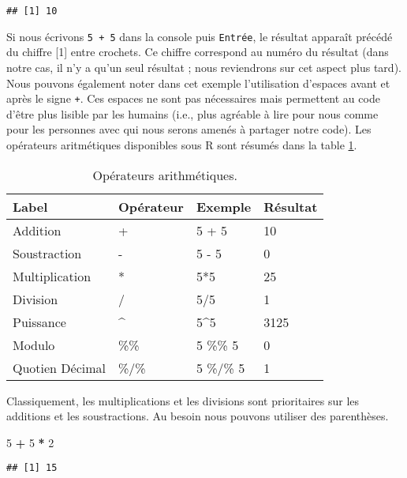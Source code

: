 \documentclass[]{book}
\newenvironment{Shaded}{\begin{snugshade}}{\end{snugshade}}
\newcommand{\DecValTok}[1]{\textcolor[rgb]{0.00,0.00,0.81}{#1}}
\newcommand{\StringTok}[1]{\textcolor[rgb]{0.31,0.60,0.02}{#1}}
\newcommand{\OperatorTok}[1]{\textcolor[rgb]{0.81,0.36,0.00}{\textbf{#1}}}
\theoremstyle{definition}
\theoremstyle{definition}
\theoremstyle{definition}
\theoremstyle{remark}
\begin{document}
\begin{verbatim}
## [1] 10
\end{verbatim}

Si nous écrivons \texttt{5\ +\ 5} dans la console puis \texttt{Entrée},
le résultat apparaît précédé du chiffre {[}1{]} entre crochets. Ce
chiffre correspond au numéro du résultat (dans notre cas, il n'y a qu'un
seul résultat ; nous reviendrons sur cet aspect plus tard). Nous pouvons
également noter dans cet exemple l'utilisation d'espaces avant et après
le signe \texttt{+}. Ces espaces ne sont pas nécessaires mais permettent
au code d'être plus lisible par les humains (i.e., plus agréable à lire
pour nous comme pour les personnes avec qui nous serons amenés à
partager notre code). Les opérateurs aritmétiques disponibles sous R
sont résumés dans la table \ref{tab:tabOpAri}.

\begin{table}

\caption{\label{tab:tabOpAri}Opérateurs arithmétiques.\label{tab:tabOpAri}}
\centering
\begin{tabular}[t]{l|l|l|l}
\hline
Label & Opérateur & Exemple & Résultat\\
\hline
Addition & + & 5 + 5 & 10\\
\hline
Soustraction & - & 5 - 5 & 0\\
\hline
Multiplication & * & 5*5 & 25\\
\hline
Division & / & 5/5 & 1\\
\hline
Puissance & \textasciicircum{} & 5\textasciicircum{}5 & 3125\\
\hline
Modulo & \%\% & 5 \%\% 5 & 0\\
\hline
Quotien Décimal & \%/\% & 5 \%/\% 5 & 1\\
\hline
\end{tabular}
\end{table}

Classiquement, les multiplications et les divisions sont prioritaires
sur les additions et les soustractions. Au besoin nous pouvons utiliser
des parenthèses.

\begin{Shaded}
\begin{Highlighting}[]
\DecValTok{5} \OperatorTok{+}\StringTok{ }\DecValTok{5} \OperatorTok{*}\StringTok{ }\DecValTok{2}
\end{Highlighting}
\end{Shaded}

\begin{verbatim}
## [1] 15
\end{verbatim}
\end{document}

